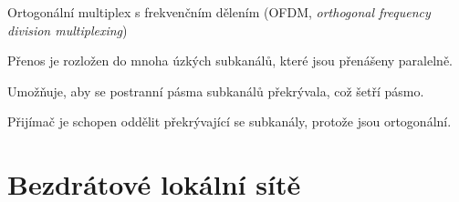 \begin{compactitem}
    \item Ortogonální multiplex s frekvenčním dělením (OFDM, \textit{orthogonal frequency division multiplexing})

    \item Přenos je rozložen do mnoha úzkých subkanálů, které jsou přenášeny paralelně.

    \item Umožňuje, aby se postranní pásma subkanálů překrývala, což šetří pásmo.

    \item Přijímač je schopen oddělit překrývající se subkanály, protože jsou ortogonální.
\end{compactitem}



\section{Bezdrátové lokální sítě}

